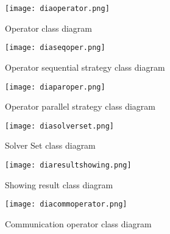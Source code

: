 \begin{figure}
	\centering
	\texttt{[image: diaoperator.png]}
	\caption[]{Operator class diagram}\label{diag:operator}
\end{figure}

\begin{figure}
	\centering
	\texttt{[image: diaseqoper.png]}
	\caption[]{Operator sequential strategy class diagram}\label{diag:seqoperstr}
\end{figure}

\begin{figure}
	\centering
	\texttt{[image: diaparoper.png]}
	\caption[]{Operator parallel strategy class diagram}\label{diag:paroperstr}
\end{figure}

\begin{figure}
	\centering
	\texttt{[image: diasolverset.png]}
	\caption[]{Solver Set class diagram}\label{diag:solverset}
\end{figure}

\clearpage 

\begin{figure}
	\centering
	\texttt{[image: diaresultshowing.png]}
	\caption[]{Showing result class diagram}\label{diag:showingres}
\end{figure}

\begin{figure}
	\centering
	\texttt{[image: diacommoperator.png]}
	\caption[]{Communication operator class diagram}\label{diag:commoper}
\end{figure}